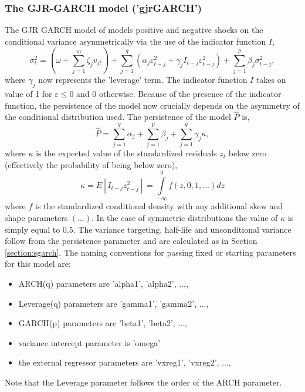 \subsubsection{The GJR-GARCH model ('gjrGARCH')}\label{section:gjrgarch}
The GJR GARCH model of \citet{Glosten1} models positive and negative shocks on
the conditional variance asymmetrically via the use of the indicator function $I$,
\begin{equation}\label{eq:gjrgarch}
\sigma _t^2 = \left( {\omega  + \sum\limits_{j = 1}^m {{\zeta _j}{v_{jt}}} } \right) + \sum\limits_{j = 1}^q {\left( {{\alpha _j}\varepsilon _{t - j}^2 + {\gamma _j}{{I}_{t - j}}\varepsilon _{t - j}^2} \right) + } \sum\limits_{j = 1}^p {{\beta _j}\sigma _{t - j}^2},
\end{equation}
where $\gamma_j$ now represents the 'leverage' term. The indicator function $I$
takes on value of 1 for $\varepsilon \le 0$ and 0 otherwise. Because of the
presence of the indicator function, the persistence of the model now crucially
depends on the asymmetry of the conditional distribution used. The persistence
of the model $\hat P$ is,
\begin{equation}\label{eq:gjrgarchp}
\hat P = \sum\limits_{j = 1}^q {{\alpha _j}}  + \sum\limits_{j = 1}^p {{\beta _j} + } \sum\limits_{j = 1}^q {{\gamma _j}\kappa },
\end{equation}
where $\kappa$ is the expected value of the standardized residuals $z_t$ below
zero (effectively the probability of being below zero),
\begin{equation}\label{eq:gjrgarchkappa}
\kappa  = E\left[ {{I_{t - j}}z_{t - j}^2} \right] = \int\limits_{ - \infty }^0 {f\left( {z,0,1,...} \right)dz}
\end{equation}
where $f$ is the standardized conditional density with any additional skew and
shape parameters $(\dots)$. In the case of symmetric distributions the value of
$\kappa$ is simply equal to $0.5$. The variance targeting, half-life and
unconditional variance follow from the persistence parameter and are calculated
as in Section \ref{section:sgarch}.
The naming conventions for passing fixed or starting parameters for this model
are:
\begin{itemize}
\item ARCH(q) parameters are 'alpha1', 'alpha2', ...,
\item Leverage(q) parameters are 'gamma1', 'gamma2', ...,
\item GARCH(p) parameters are 'beta1', 'beta2', ...,
\item variance intercept parameter is 'omega'
\item the external regressor parameters are 'vxreg1', 'vxreg2', ...,
\end{itemize}
Note that the Leverage parameter follows the order of the ARCH parameter.

